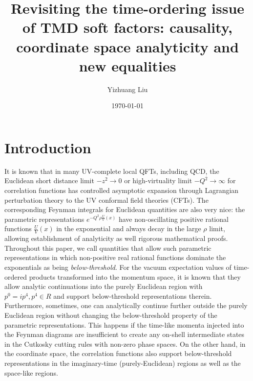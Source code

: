 \documentclass[a4paper,11pt]{article}
\title{Revisiting the time-ordering issue of TMD soft factors: causality, coordinate space analyticity and new equalities}
\author[a]{Yizhuang Liu}
\affiliation[a]{Institute of Theoretical Physics,
Jagiellonian University, 30-348 Kraków, Poland}
\date{\today}
\begin{document}
\maketitle
\flushbottom

\section{Introduction}
It is known that in many UV-complete local QFTs, including QCD, the Euclidean short distance limit $-z^2\rightarrow 0$ or high-virtuality limit $-Q^2\rightarrow \infty$ for correlation functions has controlled asymptotic expansion through Lagrangian perturbation theory to the UV conformal field theories (CFTs). The corresponding Feynman integrals for Euclidean quantities are also very nice: the parametric representations $e^{-Q^2\rho \frac{U}{V}(x)}$ have non-oscillating positive rational functions $\frac{U}{V}(x)$ in the exponential and always decay in the large $\rho$ limit, allowing establishment of analyticity as well rigorous mathematical proofs. Throughout this paper, we call quantities that allow such parametric representations in which non-positive real rational functions dominate the exponentials as being {\it below-threshold}. For the vacuum expectation values of time-ordered products transformed into the momentum space, it is known that they allow analytic continuations into the purely Euclidean region with $p^{0}=ip^4,p^4\in R$ and support below-threshold representations therein. Furthermore, sometimes, one can analytically continue further outside the purely Euclidean region without changing the below-threshold property of the parametric representations. This happens if the time-like momenta injected into the Feynman diagrams are insufficient to create any on-shell intermediate states in the Cutkosky cutting rules with non-zero phase spaces. On the other hand, in the coordinate space, the correlation functions also support below-threshold representations in the imaginary-time (purely-Euclidean) regions as well as the space-like regions.
\end{document}
